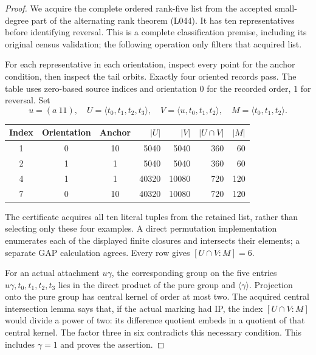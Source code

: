 \documentclass[11pt,a4paper]{article}
\newcommand{\gen}[1]{\langle#1\rangle}
\begin{document}
\begin{proof}
We acquire the complete ordered rank-five list from the accepted
small-degree part of the alternating rank theorem (L044). It has ten
representatives before identifying reversal. This is a complete
classification premise, including its original census validation;
the following operation only filters that acquired list.

For each representative in each orientation, inspect every point
for the anchor condition, then inspect the tail orbits. Exactly four
oriented records pass. The table uses zero-based source indices and
orientation $0$ for the recorded order, $1$ for reversal. Set
\[
 u=(a\ 11),\quad U=\gen{t_0,t_1,t_2,t_3},\quad
 V=\gen{u,t_0,t_1,t_2},\quad M=\gen{t_0,t_1,t_2}.
\]
\begin{center}
\begin{tabular}{ccc rrrr}
\toprule
Index&Orientation&Anchor&$|U|$&$|V|$&$|U\cap V|$&$|M|$\\
\midrule
1&0&10&5040&5040&360&60\\
2&1&1&5040&5040&360&60\\
4&1&1&40320&10080&720&120\\
7&0&10&40320&10080&720&120\\
\bottomrule
\end{tabular}
\end{center}
The certificate acquires all ten literal tuples from the retained
list, rather than selecting only these four examples. A direct
permutation implementation enumerates each of the displayed finite
closures and intersects their elements; a separate GAP calculation
agrees. Every row gives $[U\cap V:M]=6$.

For an actual attachment $u\gamma$, the corresponding group on the
five entries $u\gamma,t_0,t_1,t_2,t_3$ lies in the direct product
of the pure group and $\gen\gamma$. Projection onto the pure group
has central kernel of order at most two. The acquired central
intersection lemma says that, if the actual marking had IP, the
index $[U\cap V:M]$ would divide a power of two: its difference
quotient embeds in a quotient of that central kernel. The factor
three in six contradicts this necessary condition. This includes
$\gamma=1$ and proves the assertion.
\end{proof}
\end{document}
